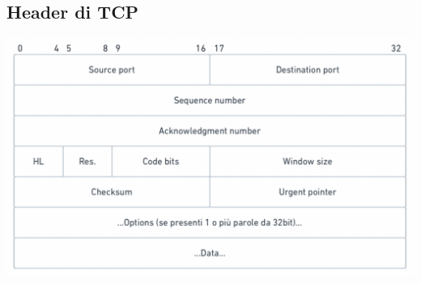 \documentclass[11pt, oneside]{article}   	%
\begin{document}
\subsection*{Header di TCP}
\begin{center}
\includegraphics[scale=0.5]{t4}
\end{center}
\end{document}
